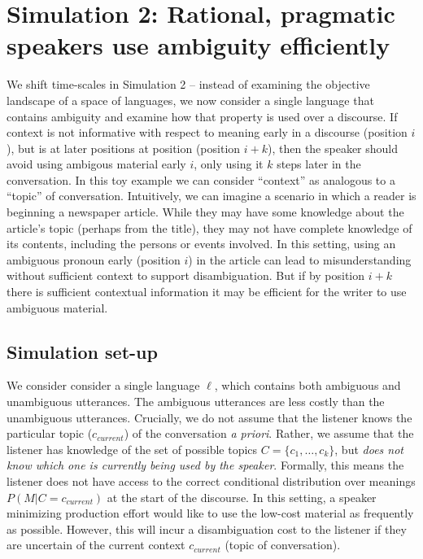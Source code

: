 \documentclass[10pt, letterpaper]{article}
\begin{document}
\section{Simulation 2: Rational, pragmatic speakers use ambiguity
efficiently}\label{simulation-2-rational-pragmatic-speakers-use-ambiguity-efficiently}

We shift time-scales in Simulation 2 -- instead of examining the
objective landscape of a space of languages, we now consider a single
language that contains ambiguity and examine how that property is used
over a discourse. If context is not informative with respect to meaning
early in a discourse (position \(i\)), but is at later positions at
position (position \(i+k\)), then the speaker should avoid using
ambigous material early \(i\), only using it \(k\) steps later in the
conversation. In this toy example we can consider ``context'' as
analogous to a ``topic'' of conversation. Intuitively, we can imagine a
scenario in which a reader is beginning a newspaper article. While they
may have some knowledge about the article's topic (perhaps from the
title), they may not have complete knowledge of its contents, including
the persons or events involved. In this setting, using an ambiguous
pronoun early (position \(i\)) in the article can lead to
misunderstanding without sufficient context to support disambiguation.
But if by position \(i+k\) there is sufficient contextual information it
may be efficient for the writer to use ambiguous material.\par

\subsection{Simulation set-up}\label{simulation-set-up-1}

We consider consider a single language \(\ell\), which contains both
ambiguous and unambiguous utterances. The ambiguous utterances are less
costly than the unambiguous utterances. Crucially, we do not assume that
the listener knows the particular topic (\(c_{current}\)) of the
conversation \textit{a priori}. Rather, we assume that the listener has
knowledge of the set of possible topics \(C = \{c_1, \dots, c_k\}\), but
\textit{does not know which one is currently being used by the speaker}.
Formally, this means the listener does not have access to the correct
conditional distribution over meanings \(P(M|C=c_{current})\) at the
start of the discourse. In this setting, a speaker minimizing production
effort would like to use the low-cost material as frequently as
possible. However, this will incur a disambiguation cost to the listener
if they are uncertain of the current context \(c_{current}\) (topic of
conversation).\par 
\end{document}
